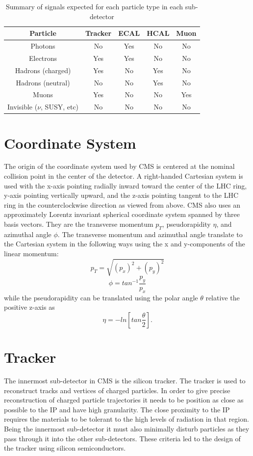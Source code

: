 \begin{table}[h]
	\centering
\begin{tabular}{|c|c|c|c|c|}
	\hline 
	Particle & Tracker & ECAL & HCAL & Muon \\ 
	\hline 
	Photons & No & Yes & No & No \\ 
	\hline 
	Electrons & Yes & Yes & No & No \\ 
	\hline 
	Hadrons (charged) & Yes & No & Yes & No \\ 
	\hline 
	Hadrons (neutral) & No & No & Yes & No \\ 
	\hline 
	Muons & Yes & No & No & Yes \\ 
	\hline 
	Invisible ($\nu$, SUSY, etc) & No & No & No & No \\ 
	\hline 
\end{tabular} 
\caption{Summary of signals expected for each particle type in each sub-detector}
\label{table:subdetsignals}
\end{table}


\section{Coordinate System}
The origin of the coordinate system used by CMS is centered at the nominal collision point in the center of the detector.  A right-handed Cartesian system is used with the x-axis pointing radially inward toward the center of the LHC ring, y-axis pointing vertically upward, and the z-axis pointing tangent to the LHC ring in the counterclockwise direction as viewed from above.  CMS also uses an approximately Lorentz invariant spherical coordinate system spanned by three basis vectors.  They are the transverse momentum $p_{T}$, pseudorapidity $\eta$, and azimuthal angle $\phi$.  The transverse momentum and azimuthal angle translate to the Cartesian system in the following ways using the x and y-components of the linear momentum:
\begin{equation}
p_{T} = \sqrt{(p_{x})^{2} + (p_{y})^{2}}
\end{equation}
\begin{equation}
\phi = tan^{-1}\frac{p_{y}}{p_{x}}
\end{equation}
while the pseudorapidity can be translated using the polar angle $\theta$ relative the positive z-axis as
\begin{equation}
\eta = -ln[tan\frac{\theta}{2}].
\end{equation}


\section{Tracker}
The innermost sub-detector in CMS is the silicon tracker.  The tracker is used to reconstruct tracks and vertices of charged particles.  In order to give precise reconstruction of charged particle trajectories it needs to be position as close as possible to the IP and have high granularity.  The close proximity to the IP requires the materials to be tolerant to the high levels of radiation in that region.  Being the innermost sub-detector it must also minimally disturb particles as they pass through it into the other sub-detectors.  These criteria led to the design of the tracker using silicon semiconductors.

